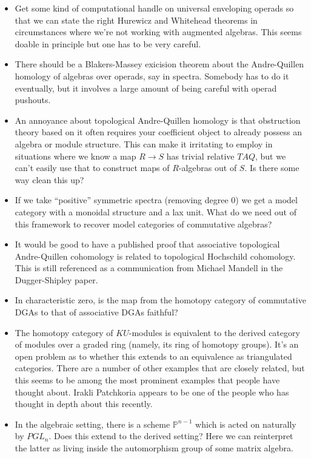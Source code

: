 \documentclass[12pt,titlepage]{article}
\theoremstyle{plain}
\theoremstyle{definition}
\theoremstyle{remark}
\begin{document}
\begin{itemize}
\item Get some kind of computational handle on universal enveloping operads so that we can state the right Hurewicz and Whitehead theorems in circumstances where we'{}re not working with augmented algebras. This seems doable in principle but one has to be very careful.
\item There should be a Blakers-Massey exicision theorem about the Andre-Quillen homology of algebras over operads, say in spectra. Somebody has to do it eventually, but it involves a large amount of being careful with operad pushouts.
\item An annoyance about topological Andre-Quillen homology is that obstruction theory based on it often requires your coefficient object to already possess an algebra or module structure. This can make it irritating to employ in situations where we know a map $R
\to S$ has trivial relative $TAQ$, but we can'{}t easily use that to construct maps of $R$-algebras out of $S$. Is there some way clean this up?
\item If we take ``{}positive''{} symmetric spectra (removing degree 0) we get a model category with a monoidal structure and a lax unit. What do we need out of this framework to recover model categories of commutative algebras?
\item It would be good to have a published proof that associative topological Andre-Quillen cohomology is related to topological Hochschild cohomology. This is still referenced as a communication from Michael Mandell in the Dugger-Shipley paper.
\item In characteristic zero, is the map from the homotopy category of commutative DGAs to that of associative DGAs faithful?
\item The homotopy category of $KU$-modules is equivalent to the derived category of modules over a graded ring (namely, its ring of homotopy groups). It'{}s an open problem as to whether this extends to an equivalence as triangulated categories. There are a number of other examples that are closely related, but this seems to be among the most prominent examples that people have thought about. Irakli Patchkoria appears to be one of the people who has thought in depth about this recently.
\item In the algebraic setting, there is a scheme $\mathbb{P}^{n-1}$ which is acted on naturally by $PGL_n$. Does this extend to the derived setting? Here we can reinterpret the latter as living inside the automorphism group of some matrix algebra.

\end{itemize}
\end{document}
